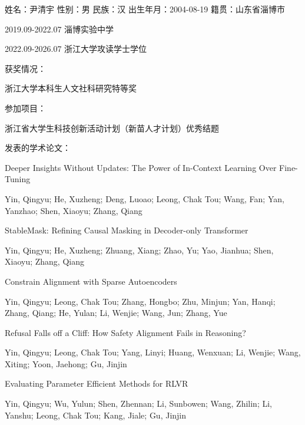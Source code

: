 \cleardoublepage
{}

姓名：尹清宇  性别：男  民族：汉  出生年月：2004-08-19  籍贯：山东省淄博市

2019.09-2022.07  淄博实验中学

2022.09-2026.07   浙江大学攻读学士学位


获奖情况：

浙江大学本科生人文社科研究特等奖

参加项目：

浙江省大学生科技创新活动计划（新苗人才计划）优秀结题

发表的学术论文：

Deeper Insights Without Updates: The Power of In-Context Learning Over Fine-Tuning

Yin, Qingyu; He, Xuzheng; Deng, Luoao; Leong, Chak Tou; Wang, Fan; Yan, Yanzhao; Shen, Xiaoyu; Zhang, Qiang

StableMask: Refining Causal Masking in Decoder-only Transformer

Yin, Qingyu; He, Xuzheng; Zhuang, Xiang; Zhao, Yu; Yao, Jianhua; Shen, Xiaoyu; Zhang, Qiang

Constrain Alignment with Sparse Autoencoders

Yin, Qingyu; Leong, Chak Tou; Zhang, Hongbo; Zhu, Minjun; Yan, Hanqi; Zhang, Qiang; He, Yulan; Li, Wenjie; Wang, Jun; Zhang, Yue

Refusal Falls off a Cliff: How Safety Alignment Fails in Reasoning?

Yin, Qingyu; Leong, Chak Tou; Yang, Linyi; Huang, Wenxuan; Li, Wenjie; Wang, Xiting; Yoon, Jaehong; Gu, Jinjin

Evaluating Parameter Efficient Methods for RLVR

Yin, Qingyu; Wu, Yulun; Shen, Zhennan; Li, Sunbowen; Wang, Zhilin; Li, Yanshu; Leong, Chak Tou; Kang, Jiale; Gu, Jinjin
